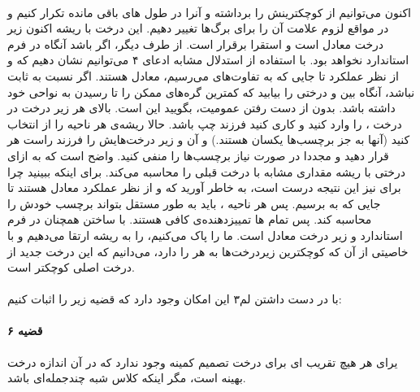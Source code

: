 \documentclass[a4paper]{article}
\begin{document}
	\paragraph{}
	اکنون می‌توانیم از
	کوچکترینش را برداشته و آنرا در طول
	های باقی مانده تکرار کنیم و در مواقع لزوم علامت آن را برای برگ‌ها تغییر دهیم. این درخت با ریشه
	اکنون زیر درخت معادل است و استقرا برقرار است. از طرف دیگر، اگر
	باشد آنگاه
	در فرم استاندارد نخواهد بود. با استفاده از استدلال مشابه ادعای ۴ می‌توانیم نشان دهیم که 
	و
	از نظر عملکرد تا جایی که به تفاوت‌های
	 می‌رسیم، معادل هستند. اگر
	نسبت به
	ثابت نباشد، آنگاه بین 
 	و
 	درختی را بیابید که کمترین گره‌های ممکن را تا رسیدن به نواحی
 	خود داشته باشد. بدون از دست رفتن عمومیت، بگویید این
 	است. بالای هر زیر درخت 
 	در درخت
 	،
 	را وارد کنید و کاری کنید
 	فرزند چپ
 	باشد. حالا ریشه‌ی هر ناحیه
 	را از 
 	انتخاب کنید (آنها به جز برچسب‌ها یکسان هستند.) و آن و زیر درخت‌هایش را فرزند راست هر
 	قرار دهید و مجددا در صورت نیاز برچسب‌ها را منفی کنید. واضح است که به ازای
 	درختی با ریشه
 	مقداری مشابه با درخت قبلی را محاسبه می‌کند. برای اینکه ببینید چرا برای  
 	نیز این نتیجه درست است، به خاطر آورید که 
 	و
 	از نظر عملکرد معادل هستند تا جایی که به
 	برسیم. پس هر ناحیه
 	،
 	باید به طور مستقل بتواند برچسب خودش را محاسبه کند. پس تمام
 	ها تمییزدهنده‌ی کافی هستند. با ساختن
 	همچنان در فرم استاندارد و زیر درخت معادل است. ما
 	را پاک می‌کنیم، 
 	را به ریشه ارتقا می‌دهیم و با خاصیتی از آن که کوچکترین زیردرخت‌ها به هر
 	را دارد، می‌دانیم که این درخت جدید از درخت اصلی
 	کوچکتر است.
 	\paragraph{}
 	با در دست داشتن لم۳ این امکان وجود دارد که قضیه زیر را اثبات کنیم:
 	\paragraph{قضیه ۶}
 	یرای هر 
 	هیچ تقریب 
 	ای برای درخت تصمیم کمینه وجود ندارد که در آن
 	اندازه درخت بهینه است، مگر اینکه کلاس
 	شبه چندجمله‌ای باشد.
\end{document}

